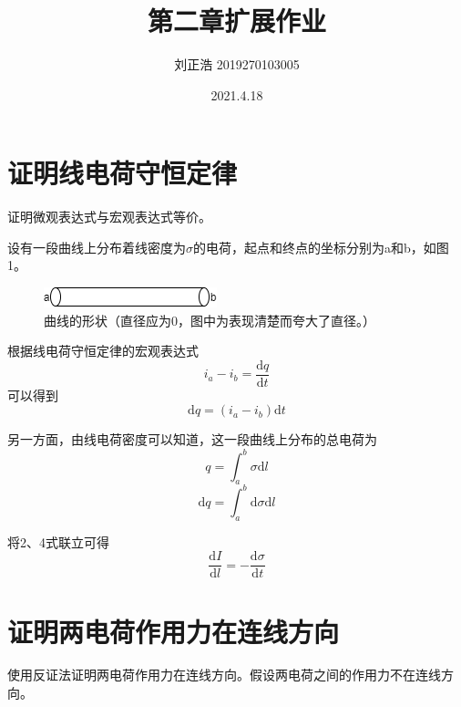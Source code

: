 \documentclass[a4paper]{article}
\title{\heiti\zihao{2} 第二章扩展作业}
\author{\songti 刘正浩 2019270103005}
\date{2021.4.18}
\begin{document}
	\maketitle
	\thispagestyle{empty}


	\tableofcontents

	\section{证明线电荷守恒定律}
		证明微观表达式与宏观表达式等价。
		
		设有一段曲线上分布着线密度为$\sigma$的电荷，起点和终点的坐标分别为a和b，如图1。
		\begin{figure}[htbp]
			\centering
			\includegraphics[scale=0.8]{1.png}
			\caption{曲线的形状（直径应为0，图中为表现清楚而夸大了直径。）}
		\end{figure}

		根据线电荷守恒定律的宏观表达式
		\begin{equation}
			i_{a} - i_{b} = \frac {\mathrm{d}q} {\mathrm{d}t}
		\end{equation}
		可以得到
		\begin{equation}
			\mathrm{d}q = (i_{a}-i_{b}) \mathrm{d}t
		\end{equation}

		另一方面，由线电荷密度可以知道，这一段曲线上分布的总电荷为
		\begin{equation}
			q = \int _ a ^ b \sigma \mathrm{d}l
		\end{equation}
		\begin{equation}
			\mathrm{d}q = \int _ a ^ b \mathrm{d}\sigma \mathrm{d}l
		\end{equation}

		将2、4式联立可得
		\begin{equation}
			\frac{\mathrm{d}I}{\mathrm{d}l} = - \frac{\mathrm{d}\sigma}{\mathrm{d}t}
		\end{equation}
	\section{证明两电荷作用力在连线方向}
		使用反证法证明两电荷作用力在连线方向。假设两电荷之间的作用力不在连线方向。
\end{document}
